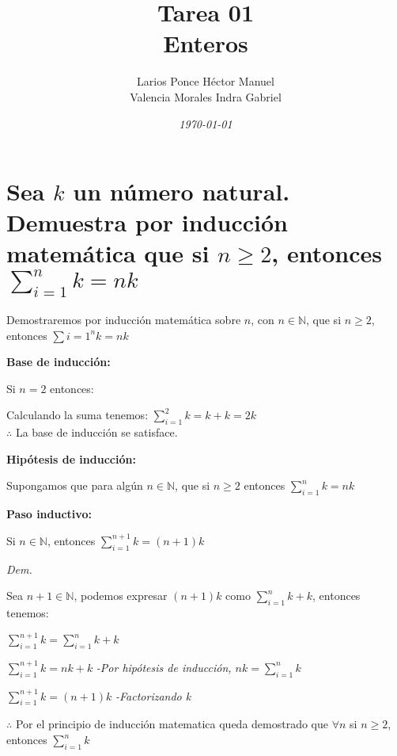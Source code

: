 \documentclass{article}
\title{\textbf{Tarea 01\\ Enteros}
\vspace{1cm}}
\author{Larios Ponce Héctor Manuel\\Valencia Morales Indra Gabriel}
\date{\textit{\today}}
\begin{document}
\maketitle

\pagebreak


\section{Sea $k$ un número natural. Demuestra por inducción\\matemática que si $n \geq 2$, entonces $\sum\limits_{i=1}^n k = nk$}

\begin{minipage}{\textwidth}
\setlength{\leftskip}{0.5cm}
Demostraremos por inducción matemática sobre $n$, con $n \in \mathbb{N}$, que si $n\geq 2$, entonces $\sum\limits{i=1}^n k = nk$

\vspace{0.5cm}

\textbf{Base de inducción:}

\setlength{\leftskip}{1cm}
Si $n  = 2$ entonces:

Calculando la suma tenemos: $\sum\limits_{i=1}^2 k = k + k = 2k$\\
$\therefore$ La base de inducción se satisface.

\vspace{0.5cm}
\setlength{\leftskip}{0.5cm}
\textbf{Hipótesis de inducción:}

\setlength{\leftskip}{1cm}
Supongamos que para algún $n \in \mathbb{N}$, que si $n \geq 2$ entonces $\sum\limits_{i = 1}^n k = nk$

\vspace{0.5cm}
\setlength{\leftskip}{0.5cm}
\textbf{Paso inductivo:}

\setlength{\leftskip}{1cm}
Si $n \in \mathbb{N}$, entonces $\sum\limits_{i=1}^{n+1} k = (n + 1)k$

\vspace{0.5cm}
\textit{Dem.}

\vspace{0.5cm}
Sea $n + 1 \in \mathbb{N}$, podemos expresar $(n + 1)k$ como $\sum\limits_{i=1}^n k + k$, entonces tenemos:

$\sum\limits_{i=1}^{n+1} k = \sum\limits_{i=1}^n k + k$

\vspace{0.5cm}
$\sum\limits_{i=1}^{n+1} k = nk + k$ \textit{-Por hipótesis de inducción, $nk = \sum\limits_{i=1}^n k$}

\vspace{0.5cm}
$\sum\limits_{i=1}^{n+1} k = (n + 1)k$ \textit{-Factorizando k}

\vspace{0.5cm}
$\therefore$ Por el principio de inducción matematica queda demostrado que $\forall n$ si $n\geq 2$, entonces $\sum\limits_{i=1}^n k$
\end{minipage}
\end{document}
